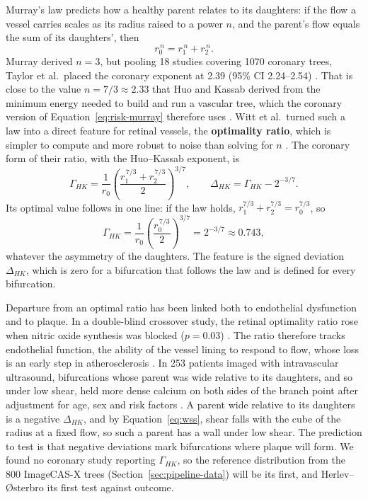 Murray's law predicts how a healthy parent relates to its daughters: if the flow a vessel carries scales as its radius raised to a power $n$, and the parent's flow equals the sum of its daughters', then
\begin{equation}
  r_0^{\,n} = r_1^{\,n} + r_2^{\,n}.
  \label{eq:risk-murray}
\end{equation}
Murray derived $n = 3$, but pooling 18 studies covering 1070 coronary trees, Taylor et al.\ placed the coronary exponent at 2.39 (95\% CI 2.24--2.54) \cite{taylor2024murray}.
That is close to the value $n = 7/3 \approx 2.33$ that Huo and Kassab derived from the minimum energy needed to build and run a vascular tree, which the coronary version of Equation~\ref{eq:risk-murray} therefore uses \cite{huo2012scaling}.
Witt et al.\ turned such a law into a direct feature for retinal vessels, the \textbf{optimality ratio}, which is simpler to compute and more robust to noise than solving for $n$ \cite{witt2010optimality}.
The coronary form of their ratio, with the Huo--Kassab exponent, is
\begin{equation}
  \Gamma_{HK} = \frac{1}{r_0}\left(\frac{r_1^{\,7/3} + r_2^{\,7/3}}{2}\right)^{3/7},
  \qquad
  \Delta_{HK} = \Gamma_{HK} - 2^{-3/7}.
  \label{eq:risk-gamma}
\end{equation}
Its optimal value follows in one line: if the law holds, $r_1^{7/3} + r_2^{7/3} = r_0^{7/3}$, so
\begin{equation*}
  \Gamma_{HK} = \frac{1}{r_0}\left(\frac{r_0^{\,7/3}}{2}\right)^{3/7} = 2^{-3/7} \approx 0.743,
\end{equation*}
whatever the asymmetry of the daughters.
The feature is the signed deviation $\Delta_{HK}$, which is zero for a bifurcation that follows the law and is defined for every bifurcation.

Departure from an optimal ratio has been linked both to endothelial dysfunction and to plaque.
In a double-blind crossover study, the retinal optimality ratio rose when nitric oxide synthesis was blocked ($p = 0.03$) \cite{witt2010optimality}.
The ratio therefore tracks endothelial function, the ability of the vessel lining to respond to flow, whose loss is an early step in atherosclerosis \cite{chatzizisis2007ess}.
In 253 patients imaged with intravascular ultrasound, bifurcations whose parent was wide relative to its daughters, and so under low shear, held more dense calcium on both sides of the branch point after adjustment for age, sex and risk factors \cite{schoenenberger2012murray}.
A parent wide relative to its daughters is a negative $\Delta_{HK}$, and by Equation~\ref{eq:wss}, shear falls with the cube of the radius at a fixed flow, so such a parent has a wall under low shear.
The prediction to test is that negative deviations mark bifurcations where plaque will form.
We found no coronary study reporting $\Gamma_{HK}$, so the reference distribution from the 800 ImageCAS-X trees (Section~\ref{sec:pipeline-data}) will be its first, and Herlev--{\O}sterbro its first test against outcome.

